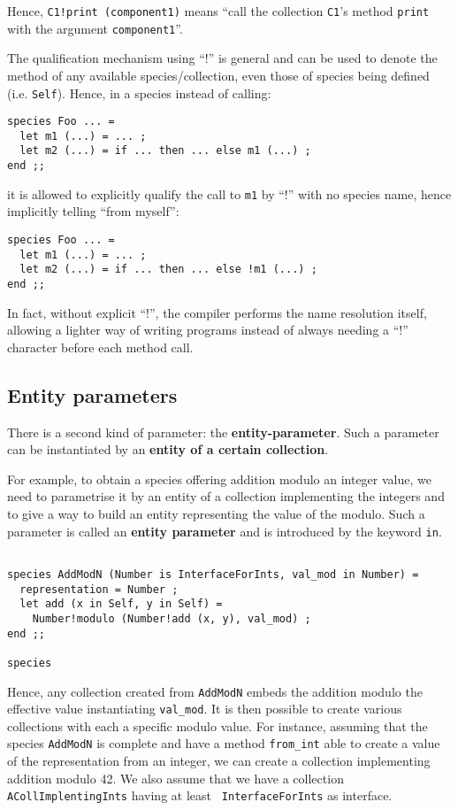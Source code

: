 Hence, {\tt C1!print (component1)} means ``call the collection
{\tt C1}'s method {\tt print} with the argument {\tt component1}''.

The qualification mechanism using ``!'' is general and can be used to
denote the method of any available species/collection, even those of
species being defined (i.e. {\tt Self}). Hence, in a species instead of calling:
{\scriptsize
\begin{lstlisting}
species Foo ... =
  let m1 (...) = ... ;
  let m2 (...) = if ... then ... else m1 (...) ;
end ;;
\end{lstlisting}
}
it is allowed to explicitly qualify the call to {\tt m1} by ``!''
with no species name, hence implicitly telling ``from myself'':
{\scriptsize
\begin{lstlisting}
species Foo ... =
  let m1 (...) = ... ;
  let m2 (...) = if ... then ... else !m1 (...) ;
end ;;
\end{lstlisting}
}
In fact, without explicit ``!'', the {\focal} compiler performs the
name resolution itself, allowing a lighter way of writing programs
instead of always needing a ``!'' character before each method call.



\subsection{Entity parameters}
\label{entity-parameter}
There is a second kind of parameter: the {\bf entity-parameter}. Such
a parameter can be instantiated by an {\bf entity of a certain
collection}.

For example, to obtain a species offering addition modulo an
integer value, we need to parametrise it by an entity of a collection
implementing the integers and to give a way to build an entity
representing the value of the modulo. Such a parameter is called an
{\bf entity parameter} and is introduced by the keyword {\tt in}.
{\scriptsize
\begin{lstlisting}

species AddModN (Number is InterfaceForInts, val_mod in Number) =
  representation = Number ;
  let add (x in Self, y in Self) =
    Number!modulo (Number!add (x, y), val_mod) ;
end ;;

species
\end{lstlisting}
}

Hence, any collection created from {\tt AddModN} embeds the addition
modulo the effective value instantiating {\tt val\_mod}. It is then
possible to create various collections with each a specific modulo
value. For instance, assuming that the species {\tt AddModN} is
complete and have a method {\tt from\_int} able to create a value of
the representation from an integer, we can create a collection
implementing addition modulo 42. We also assume that we have a
collection {\tt ACollImplentingInts} having at least {\tt
InterfaceForInts} as interface.

